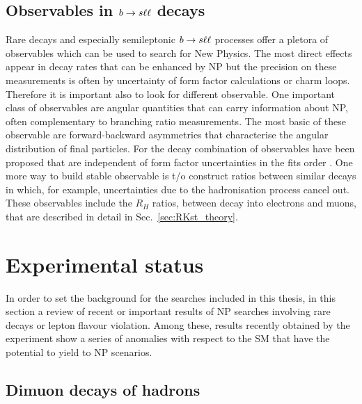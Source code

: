 \subsection{Observables in $b\rightarrow s\ell\ell$ decays}
\label{sec:observables}

Rare decays and especially semileptonic $b\rightarrow s\ell\ell$ processes offer a pletora
of observables which can be used to search for New Physics.
The most direct effects appear in decay rates that can be enhanced by NP but the precision on
these measurements is often by uncertainty of form factor calculations or charm loops.
Therefore it is important also to look for different observable.
One important class of observables are angular quantities that can carry information about NP,
often complementary to branching ratio measurements. The most basic of these observable are
forward-backward asymmetries that characterise the angular distribution of final particles.
For the \Bz\to\Kstar\mumu decay combination of observables have been proposed that are 
independent of form factor uncertainties in the fits order \cite{}.
One more way to build stable observable is t/o construct ratios between similar
decays in which, for example, uncertainties due to the hadronisation process cancel out.
These observables include the $R_H$ ratios, between \Bz decay into electrons and muons,
that are described in detail in Sec.~\ref{sec:RKst_theory}.


\section{Experimental status}

In order to set the background for the searches included in this thesis, in this section a review of recent
or important results of NP searches involving rare decays or lepton flavour violation.
Among these, results recently obtained by the \lhcb experiment show a series of anomalies
with respect to the SM that have the potential to yield to NP scenarios.


\subsection{Dimuon decays of \bquark hadrons}

